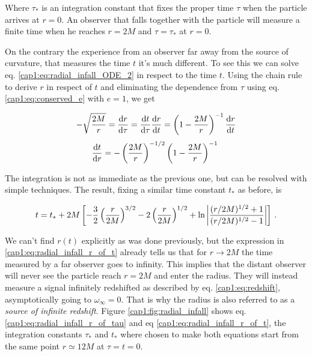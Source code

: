 Where $\tau_*$ is an integration constant that fixes the proper time $\tau$
when the particle arrives at $r = 0$.
An observer that falls together with the particle will measure a finite time
when he reaches $r = 2M$ and $\tau = \tau_*$ at $r = 0$.

On the contrary the experience from an observer far away from the source of
curvature, that measures the \Sh time $t$ it's much different.
To see this we can solve eq. \ref{cap1:eq:radial_infall_ODE_2} in respect to
the \Sh time $t$.
Using the chain rule to derive $r$ in respect of $t$ and eliminating the
dependence from $\tau$ using eq. \ref{cap1:eq:conserved_e} with $e = 1$, we get

\begin{align*}
    - \sqrt{\frac{2 M}{r}} = \dv{r}{\tau} = \dv{t}{\tau} \dv{r}{t}
    = \left(1 - \frac{2M}{r} \right)^{-1} \dv{r}{t}
\end{align*}
\begin{equation*}
    \dv{t}{r} = - \left(\frac{2 M}{r}\right)^{-1/2}
    \left(1 - \frac{2M}{r} \right)^{-1} \,  \, 
\end{equation*}

The integration is not as immediate as the previous one, but can be resolved
with simple techniques.
The result, fixing a similar time constant $t_*$ as before, is

\begin{equation}
    t = t_* + 2M \left[ -\frac{3}{2} \left(\frac{r}{2M}\right)^{3/2}
    - 2 \left(\frac{r}{2M}\right)^{1/2}
    + \ln \abs{\frac{(r/2M)^{1/2} + 1}{(r/2M)^{1/2} - 1}} \right] \, .
    \label{cap1:eq:radial_infall_r_of_t}
\end{equation}

We can't find $r(t)$ explicitly as was done previously, but the expression in
\ref{cap1:eq:radial_infall_r_of_t} already tells us that for
$r \rightarrow 2M$ the time measured by a far observer goes to infinity.
This implies that the distant observer will never see the particle reach
$r = 2M$ and enter the \Sh radius.
They will instead measure a signal infinitely redshifted as described by eq.
\ref{cap1:eq:redshift}, asymptotically going to $\omega_\infty = 0$.
That is why the \Sh radius is also referred to as a
\textit{source of infinite redshift}.
Figure \ref{cap1:fig:radial_infall} shows eq.
\ref{cap1:eq:radial_infall_r_of_tau} and eq
\ref{cap1:eq:radial_infall_r_of_t}, the integration constants $\tau_*$ and
$t_*$ where chosen to make both equations start from the same point
$r \simeq 12M$ at $\tau = t =  0$.

